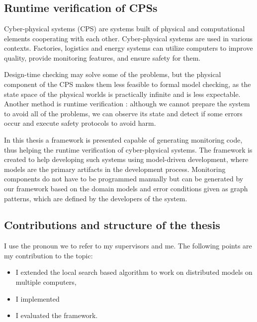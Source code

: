 \chapter{\bevezetes}

\section{Runtime verification of CPSs}
Cyber-physical systems (CPS) are systems built of physical and computational elements cooperating with each other.
Cyber-physical systems are used in various contexts. 
Factories, logistics and energy systems can utilize computers to improve quality, provide monitoring features, and ensure safety for them.

Design-time checking may solve some of the problems, but the physical component of the CPS makes them less feasible to formal model checking, as the state space of the physical worlds is practically infinite and is less expectable.
Another method is runtime verification \cite{fasecikk}: although we cannot prepare the system to avoid all of the problems, we can observe its state and detect if some errors occur and execute safety protocols to avoid harm. 


In this thesis a framework is presented capable of generating monitoring code, thus helping the runtime verification of cyber-physical systems. 
The framework is created to help developing such systems using model-driven development, where models are the primary artifacts in the development process.
Monitoring components do not have to be programmed manually but can be generated by our framework based on the domain models and error conditions given as graph patterns, which are defined by the developers of the system.

\section{Contributions and structure of the thesis}

I use the pronoun we to refer to my supervisors and me. 
The following points are my contribution to the topic:
\begin{itemize}
	\item I extended the local search based algorithm to work on distributed models on multiple computers,
	\item I implemented 
	\item I evaluated the framework.
\end{itemize}
	

